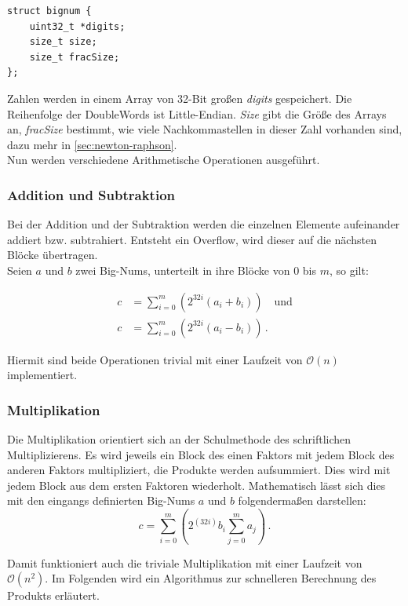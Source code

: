 \documentclass[course=erap]{aspdoc}
\begin{document}
\begin{lstlisting}
struct bignum {
    uint32_t *digits;
    size_t size;
    size_t fracSize;
};
\end{lstlisting}

Zahlen werden in einem Array von 32-Bit großen \textit{digits} gespeichert. Die Reihenfolge der DoubleWords ist Little-Endian. \textit{Size} gibt die Größe des Arrays an, \textit{fracSize} bestimmt, wie viele Nachkommastellen in dieser Zahl vorhanden sind, dazu mehr
in \ref{sec:newton-raphson}. \\
Nun werden verschiedene Arithmetische Operationen ausgeführt.

\subsubsection*{Addition und Subtraktion}
Bei der Addition und der Subtraktion werden die einzelnen Elemente aufeinander addiert bzw. subtrahiert. Entsteht ein Overflow, wird dieser auf die nächsten Blöcke übertragen. \\
Seien $a$ und $b$ zwei Big-Nums, unterteilt in ihre Blöcke von $0$ bis $m$, so gilt:

\begin{align}
  c &= \sum_{i=0}^m (2^{32i} (a_i + b_i)) \quad  \text{und} \label{eq:bignum_addition} \\ 
  c &= \sum_{i=0}^m (2^{32i} (a_i - b_i)) \,  .          \label{eq:bignum_subtraktion}
\end{align}

Hiermit sind beide Operationen trivial mit einer Laufzeit von $\mathcal{O}(n)$ implementiert.

\subsubsection*{Multiplikation}
Die Multiplikation orientiert sich an der Schulmethode des schriftlichen Multiplizierens. Es wird jeweils ein Block des einen Faktors mit jedem Block des anderen Faktors multipliziert, die Produkte werden aufsummiert.
Dies wird mit jedem Block aus dem ersten Faktoren wiederholt. Mathematisch lässt sich dies mit den eingangs definierten Big-Nums $a$ und $b$ folgendermaßen darstellen:
\begin{equation}
  c = \sum_{i=0}^m (2^{(32i)} b_i \sum_{j=0}^m a_j) \, .
\end{equation}

Damit funktioniert auch die triviale Multiplikation mit einer Laufzeit von $\mathcal{O}(n^2)$. Im Folgenden wird ein Algorithmus zur schnelleren Berechnung des Produkts erläutert.
\end{document}
